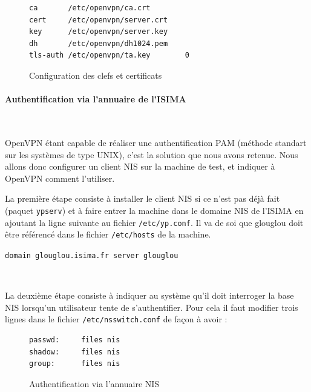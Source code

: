 \begin{figure}[H]
	\begin{center}
		\begin{minipage}{0.90\textwidth}
			\begin{lstlisting}[frame=trBL]
ca       /etc/openvpn/ca.crt
cert     /etc/openvpn/server.crt
key      /etc/openvpn/server.key
dh       /etc/openvpn/dh1024.pem
tls-auth /etc/openvpn/ta.key        0
			\end{lstlisting}
		\end{minipage}
	\end{center}
	\caption{Configuration des clefs et certificats}
	\label{configuration-clefs-et-certificats-serveur}
\end{figure}


\paragraph{Authentification via l'annuaire de l'ISIMA}
~

OpenVPN étant capable de réaliser une authentification PAM (méthode standart sur les systèmes de type UNIX), c'est la solution que nous avons retenue. Nous allons donc configurer un client NIS sur la machine de test, et indiquer à OpenVPN comment l'utiliser.

La première étape consiste à installer le client NIS si ce n'est pas déjà fait (paquet \texttt{ypserv}) et à faire entrer la machine dans le domaine NIS de l'ISIMA en ajoutant la ligne suivante au fichier \verb|/etc/yp.conf|. Il va de soi que glouglou doit être référencé dans le fichier \verb|/etc/hosts| de la machine.

\verb|domain glouglou.isima.fr server glouglou|

~

La deuxième étape consiste à indiquer au système qu'il doit interroger la base NIS lorsqu'un utilisateur tente de s'authentifier. Pour cela il faut modifier trois lignes dans le fichier \verb|/etc/nsswitch.conf| de façon à avoir :

\begin{figure}[H]
	\begin{center}
		\begin{minipage}{0.90\textwidth}
			\begin{lstlisting}[frame=trBL]
passwd:     files nis
shadow:     files nis
group:      files nis
			\end{lstlisting}
		\end{minipage}
	\end{center}
	\caption{Authentification via l'annuaire NIS}
	\label{nsswitch_conf}
\end{figure}

